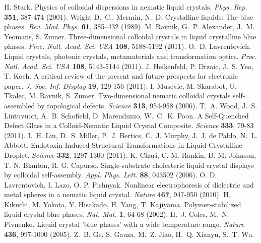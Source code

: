 \documentclass[12pt]{article}
\begin{document}
\begin{thebibliography}{99}
 H. Stark. Physics of
colloidal dispersions in nematic liquid crystals. 
{\it Phys. Rep.} {\bf 351}, 387-474 (2001).
 Wright D.~C., Mermin, N.~D. Crystalline liquids: The blue phases. {\it Rev. Mod. Phys.} {\bf 61}, 385–432 (1989).
 M. Ravnik, G.~P. Alexander, J.~M. Yeomans,  
S. Zumer.  Three-dimensional colloidal crystals in liquid crystalline 
blue phases. {\it Proc. Natl. Acad. Sci. USA} {\bf 108}, 5188-5192 (2011).
 O.~D. Lavrentovich.
 Liquid crystals, photonic crystals, metamaterials and transformation optics. 
{\it Proc. Natl. Acad. Sci. USA} {\bf 108}, 5143-5144 (2011).
 J. Heikenfeld, P. Drzaic,  J.~S. Yeo, T. Koch.
A critical review of the present and future prospects for electronic paper.
{\it J. Soc. Inf. Display} {\bf 19}, 129-156 (2011).
 I. Musevic, M. Skarabot, U. Tkalec, M. Ravnik,
S. Zumer. Two-dimensional nematic colloidal crystals self-assembled by topological defects. {\it Science} {\bf 313}, 954-958 (2006).
 T.~A. Wood, J.~S. Lintuvuori, A.~B. Schofield, D. Marenduzzo,
W.~C.~K. Poon. A Self-Quenched Defect Glass in a Colloid-Nematic Liquid Crystal Composite. {\it Science} {\bf 333}, 79-83 (2011).
 I.~H. Lin, D.~S. Miller, P.~J. Bertics, C.~J. Murphy, J.~J. de Pablo, N.~L. Abbott. Endotoxin-Induced Structural Transformations in Liquid Crystalline Droplet. {\it Science} {\bf 332}, 1297-1300 (2011).
 K. Chari, C. M. Rankin, D. M. Johnson, T. N. Blanton,
R. G. Capurso. Single-substrate cholesteric liquid crystal displays by colloidal self-assembly. {\it Appl. Phys. Lett.} {\bf 88}, 043502 (2006).
  O. D. Lavrentovich,	I. Lazo, O. P. Pishnyak.
Nonlinear electrophoresis of dielectric and metal spheres in a nematic liquid 
crystal. {\it Nature} {\bf 467}, 947-950 (2010).
 H. Kikuchi, M. Yokota, Y. Hisakado, H. Yang, T. Kajiyama.
Polymer-stabilized liquid crystal blue phases.
{\it Nat. Mat.} {\bf 1}, 64-68 (2002).
 H.~J. Coles, M.~N. Pivnenko.
Liquid crystal 'blue phases' with a wide temperature range.
{\it Nature} {\bf 436}, 997-1000 (2005).
 Z.~B. Ge, S. Gauza, M.~Z. Jiao, H.~Q. Xianyu, S.~T. Wu.

\end{thebibliography}
\end{document}
